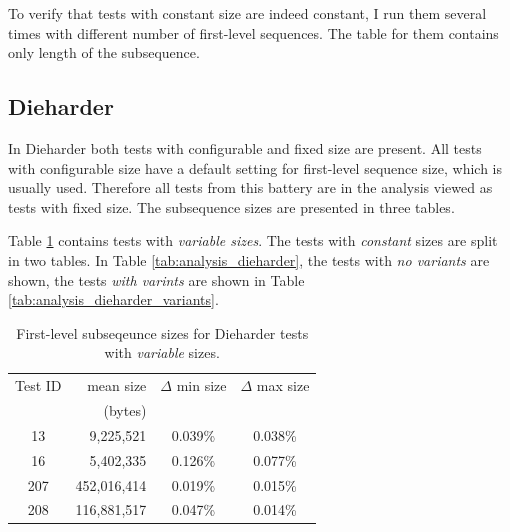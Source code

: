 \documentclass[
  digital,     %
  oneside,     %
  nosansbold,  %
  nocolorbold, %
  nolof,         %
  nolot,         %
]{fithesis4}
\begin{document}
To verify that tests with constant size are indeed constant, I run them several times with different number of first-level sequences. The table for them contains only length of the subsequence.



\subsection{Dieharder}

In Dieharder both tests with configurable and fixed size are present. All tests with configurable size have a default setting for first-level sequence size, which is usually used. Therefore all tests from this battery are in the analysis viewed as tests with fixed size. The subsequence sizes are presented in three tables.

Table \ref{tab:analysis_dieharder_variable} contains tests with \emph{variable sizes}. The tests with \emph{constant} sizes are split in two tables. In Table \ref{tab:analysis_dieharder}, the tests with \emph{no variants} are shown, the tests \emph{with varints} are shown in Table \ref{tab:analysis_dieharder_variants}.

\begin{table}[H]
  \begin{tabularx}{0.7\textwidth}{c|r|c|c}
    Test ID & mean size & $\Delta$ min size & $\Delta$ max size\\
     & (bytes) & & \\
    \midrule
    13 & 9,225,521 & 0.039\% & 0.038\%\\
    16 & 5,402,335 & 0.126\% & 0.077\%\\
    207 & 452,016,414 & 0.019\% & 0.015\%\\
    208 & 116,881,517 & 0.047\% & 0.014\%\\
 
  \end{tabularx}
  \caption{First-level subseqeunce sizes for Dieharder tests with \emph{variable} sizes.}
  \label{tab:analysis_dieharder_variable}
\end{table}
\end{document}
